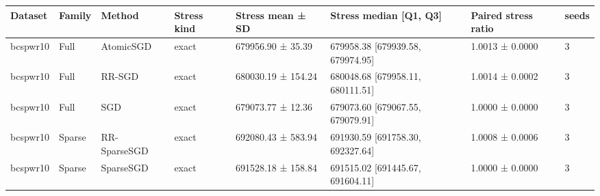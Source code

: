 \begin{tabular}{llllllll}
\hline
Dataset & Family & Method & Stress kind & Stress mean ± SD & Stress median [Q1, Q3] & Paired stress ratio & seeds \\
\hline
bcspwr10 & Full & AtomicSGD & exact & 679956.90 ± 35.39 & 679958.38 [679939.58, 679974.95] & 1.0013 ± 0.0000 & 3 \\
bcspwr10 & Full & RR-SGD & exact & 680030.19 ± 154.24 & 680048.68 [679958.11, 680111.51] & 1.0014 ± 0.0002 & 3 \\
bcspwr10 & Full & SGD & exact & 679073.77 ± 12.36 & 679073.60 [679067.55, 679079.91] & 1.0000 ± 0.0000 & 3 \\
bcspwr10 & Sparse & RR-SparseSGD & exact & 692080.43 ± 583.94 & 691930.59 [691758.30, 692327.64] & 1.0008 ± 0.0006 & 3 \\
bcspwr10 & Sparse & SparseSGD & exact & 691528.18 ± 158.84 & 691515.02 [691445.67, 691604.11] & 1.0000 ± 0.0000 & 3 \\
\hline
\end{tabular}
